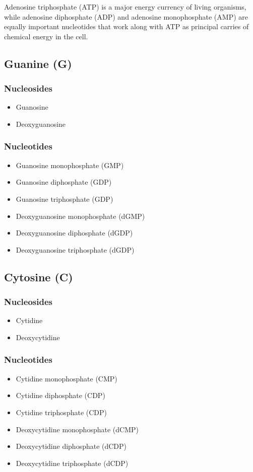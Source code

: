 \documentclass[11pt]{article}
\begin{document}
Adenosine triphosphate (ATP) is a major energy currency of living organisms, while adenosine diphosphate (ADP) and adenosine monophosphate (AMP) are equally important nucleotides that work along with ATP as principal carries of chemical energy in the cell.

\newpage
\subsection{Guanine (G)}
\label{sec:org0f7f03a}

\subsubsection{Nucleosides}
\label{sec:org881dd02}
\begin{itemize}
\item Guanosine
\item Deoxyguanosine
\end{itemize}
\subsubsection{Nucleotides}
\label{sec:org67094ec}
\begin{itemize}
\item Guanosine monophosphate (GMP)
\item Guanosine diphosphate (GDP)
\item Guanosine triphosphate (GDP)
\item Deoxyguanosine monophosphate (dGMP)
\item Deoxyguanosine diphosphate (dGDP)
\item Deoxyguanosine triphosphate (dGDP)
\end{itemize}
\subsection{Cytosine (C)}
\label{sec:org0e32941}

\subsubsection{Nucleosides}
\label{sec:orgdbc692e}
\begin{itemize}
\item Cytidine
\item Deoxycytidine
\end{itemize}
\subsubsection{Nucleotides}
\label{sec:orgb4d9287}
\begin{itemize}
\item Cytidine monophosphate (CMP)
\item Cytidine diphosphate (CDP)
\item Cytidine triphosphate (CDP)
\item Deoxycytidine monophosphate (dCMP)
\item Deoxycytidine diphosphate (dCDP)
\item Deoxycytidine triphosphate (dCDP)

\newpage
\end{itemize}
\end{document}
